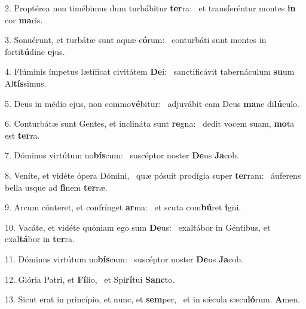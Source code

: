 2. Proptérea non timébimus dum turbábitur \textbf{ter}ra: \ast\  et transferéntur montes \textbf{in} cor \textbf{ma}ris.\

3. Sonuérunt, et turbátæ sunt aquæ e\textbf{ó}rum: \ast\  conturbáti sunt montes in forti\textbf{tú}dine \textbf{e}jus.\

4. Flúminis ímpetus lætíficat civitátem \textbf{De}i: \ast\  sanctificávit tabernáculum \textbf{su}um Al\textbf{tís}simus.\

5. Deus in médio ejus, non commo\textbf{vé}bitur: \ast\  adjuvábit eam Deus \textbf{ma}ne di\textbf{lú}culo.\

6. Conturbátæ sunt Gentes, et inclináta sunt \textbf{re}gna: \ast\  dedit vocem suam, \textbf{mo}ta est \textbf{ter}ra.\

7. Dóminus virtútum no\textbf{bís}cum: \ast\  suscéptor noster \textbf{De}us \textbf{Ja}cob.\

8. Veníte, et vidéte ópera Dómini, \dag\  quæ pósuit prodígia super \textbf{ter}ram: \ast\  áuferens bella usque ad \textbf{fi}nem \textbf{ter}ræ.\

9. Arcum cónteret, et confrínget \textbf{ar}ma: \ast\  et scuta com\textbf{bú}ret \textbf{i}gni.\

10. Vacáte, et vidéte quóniam ego sum \textbf{De}us: \ast\  exaltábor in Géntibus, et exal\textbf{tá}bor in \textbf{ter}ra.\

11. Dóminus virtútum no\textbf{bís}cum: \ast\  suscéptor noster \textbf{De}us \textbf{Ja}cob.\

12. Glória Patri, et \textbf{Fí}lio, \ast\  et Spi\textbf{rí}tui \textbf{Sanc}to.\

13. Sicut erat in princípio, et nunc, et \textbf{sem}per, \ast\  et in sǽcula sæcu\textbf{ló}rum. \textbf{A}men.\

